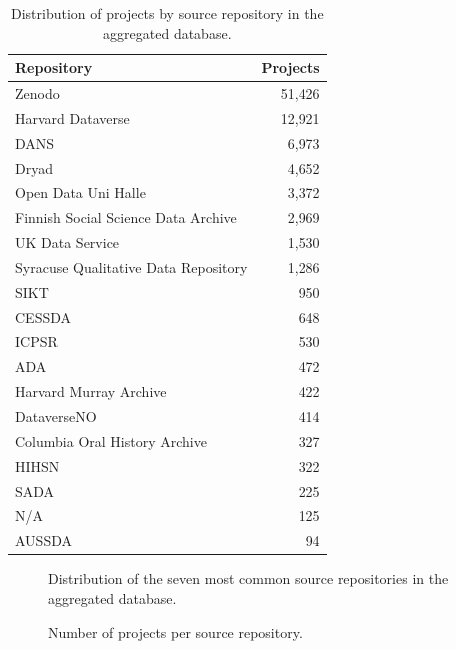 \begin{table}[H]
\centering
\caption{Distribution of projects by source repository in the aggregated database.}
\label{tab:repository-distribution}
\begin{tabular}{lr}
\toprule
\textbf{Repository} & \textbf{Projects} \\
\midrule
Zenodo                                   & 51{,}426 \\
Harvard Dataverse                        & 12{,}921 \\
DANS                                     & 6{,}973 \\
Dryad                                    & 4{,}652 \\
Open Data Uni Halle                      & 3{,}372 \\
Finnish Social Science Data Archive      & 2{,}969 \\
UK Data Service                          & 1{,}530 \\
Syracuse Qualitative Data Repository     & 1{,}286 \\
SIKT                                     & 950 \\
CESSDA                                   & 648 \\
ICPSR                                    & 530 \\
ADA                                      & 472 \\
Harvard Murray Archive                   & 422 \\
DataverseNO                              & 414 \\
Columbia Oral History Archive            & 327 \\
HIHSN                                    & 322 \\
SADA                                     & 225 \\
N/A                                      & 125 \\
AUSSDA                                   & 94 \\
\bottomrule
\end{tabular}
\end{table}

\begin{figure}[H]
    \centering
    
    \caption{Distribution of the seven most common source repositories in the aggregated database.}
    \label{fig:repo_pie}
\end{figure}

\begin{figure}[H]
    \centering
    
    \caption{Number of projects per source repository.}
    \label{fig:repo_histogram}
\end{figure}
